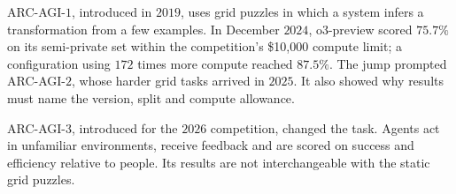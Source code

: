 
ARC-AGI-$1$, introduced in $2019$, uses grid puzzles in which a system infers a transformation from a few examples. In December $2024$,
o3-preview scored $75.7\%$ on its semi-private set within the competition's \$10{,}000 compute limit; a configuration using $172$ times
more compute reached $87.5\%$. The jump prompted ARC-AGI-$2$, whose harder grid tasks arrived in $2025$. It also showed why results must
name the version, split and compute allowance.

ARC-AGI-$3$, introduced for the $2026$ competition, changed the task. Agents act in unfamiliar environments, receive feedback and are
scored on success and efficiency relative to people. Its results are not interchangeable with the static grid puzzles.

\endgroup
